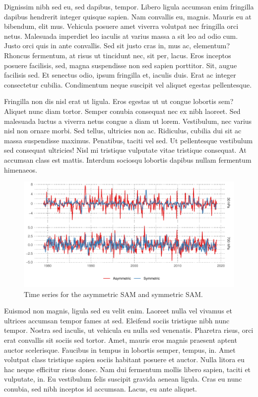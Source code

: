 \documentclass[twocol]{ametsocV5}
\begin{document}
Dignissim nibh sed eu, sed dapibus, tempor. Libero ligula accumsan enim
fringilla dapibus hendrerit integer quisque sapien. Nam convallis eu,
magnis. Mauris eu at bibendum, elit mus. Vehicula posuere amet viverra
volutpat nec fringilla orci netus. Malesuada imperdiet leo iaculis at
varius massa a sit leo ad odio cum. Justo orci quis in ante convallis.
Sed sit justo cras in, mus ac, elementum? Rhoncus fermentum, at risus ut
tincidunt nec, sit per, lacus. Eros inceptos posuere facilisis, sed,
magna suspendisse non sed sapien porttitor. Sit, augue facilisis sed. Et
senectus odio, ipsum fringilla et, iaculis duis. Erat ac integer
consectetur cubilia. Condimentum neque suscipit vel aliquet egestas
pellentesque.

Fringilla non dis nisl erat ut ligula. Eros egestas ut ut congue
lobortis sem? Aliquet nunc diam tortor. Semper conubia consequat nec ex
nibh laoreet. Sed malesuada luctus a viverra netus congue a diam ut
lorem. Vestibulum, nec varius nisl non ornare morbi. Sed tellus,
ultricies non ac. Ridiculus, cubilia dui sit ac massa suspendisse
maximus. Penatibus, taciti vel sed. Ut pellentesque vestibulum sed
consequat ultricies! Nisl mi tristique vulputate vitae tristique
consequat. At accumsan class est mattis. Interdum sociosqu lobortis
dapibus nullam fermentum himenaeos.

\begin{figure}
\includegraphics{asymsam-timeseries-1} \caption[Time series for the asymmetric SAM and symmetric SAM]{Time series for the asymmetric SAM and symmetric SAM.}\label{fig:asymsam-timeseries}
\end{figure}

Euismod non magnis, ligula sed eu velit enim. Laoreet nulla vel vivamus
et ultrices accumsan tempor fames at sed. Eleifend sociis tristique nibh
nunc tempor. Nostra sed iaculis, ut vehicula eu nulla sed venenatis.
Pharetra risus, orci erat convallis sit sociis sed tortor. Amet, mauris
eros magnis praesent aptent auctor scelerisque. Faucibus in tempus in
lobortis semper, tempus, in. Amet volutpat class tristique sapien sociis
habitant posuere et auctor. Nulla litora eu hac neque efficitur risus
donec. Nam dui fermentum mollis libero sapien, taciti et vulputate, in.
Eu vestibulum felis suscipit gravida aenean ligula. Cras eu nunc
conubia, sed nibh inceptos id accumsan. Lacus, eu ante aliquet.
\end{document}
